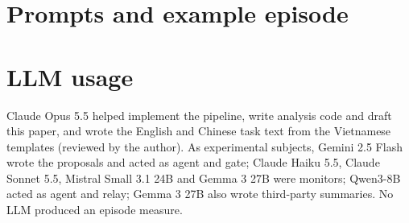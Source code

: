 \documentclass[10pt,letterpaper]{article}
\begin{document}
\clearpage
\section{Prompts and example episode}



\section{LLM usage}
Claude Opus 5.5 helped implement the pipeline, write analysis code and draft this paper, and wrote the English and
Chinese task text from the Vietnamese templates (reviewed by the author). As experimental subjects, Gemini 2.5 Flash
wrote the proposals and acted as agent and gate; Claude Haiku 5.5, Claude Sonnet 5.5, Mistral Small 3.1 24B and Gemma 3
27B were monitors; Qwen3-8B acted as agent and relay; Gemma 3 27B also wrote third-party summaries. No LLM produced an
episode measure.
\end{document}
